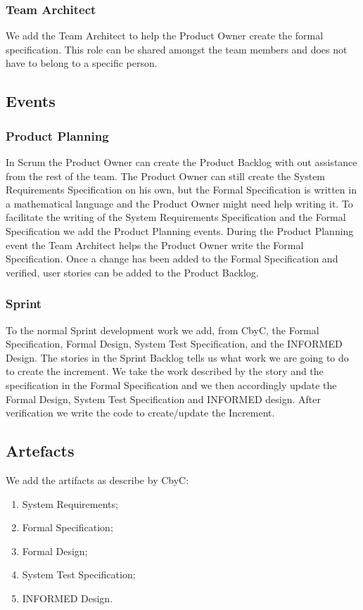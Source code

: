 \subsubsection{Team Architect}
We add the Team Architect to help the Product Owner create the formal specification.
This role can be shared amongst the team members and does not have to belong to a
specific person.

\subsection{Events}

\subsubsection{Product Planning}
In Scrum the Product Owner can create the Product Backlog with out assistance
from the rest of the team. The Product Owner can still create the 
System Requirements Specification on his own, but the Formal Specification is
written in a mathematical language and the Product Owner might need help writing
it. To facilitate the writing of the System Requirements Specification and the 
Formal Specification we add the Product Planning events. During the Product Planning 
event the Team Architect helps the Product Owner write the Formal Specification.
Once a change has been added to the Formal Specification and verified, user 
stories can be added to the Product Backlog.

\subsubsection{Sprint}
To the normal Sprint development work we add, from CbyC, the Formal Specification,
Formal Design, System Test Specification, and the INFORMED Design. The stories in
the Sprint Backlog tells us what work we are going to do to create the increment. We 
take the work described by the story and the specification in the Formal Specification 
and we then accordingly update the Formal Design, System Test Specification 
and INFORMED design. After verification we write the code to create/update the
Increment.

\subsection{Artefacts}

We add the artifacts as describe by CbyC: 

\begin{enumerate}
	\item System Requirements;
	\item Formal Specification;
	\item Formal Design;
	\item System Test Specification;
	\item INFORMED Design.
\end{enumerate}  

